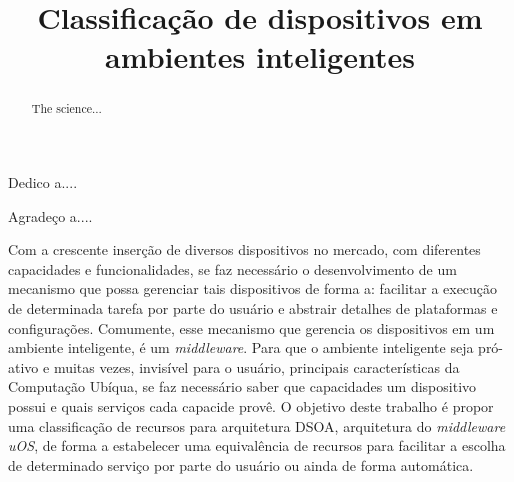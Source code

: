 \documentclass[bacharelado]{unb-cic}
\title{Classificação de dispositivos em ambientes inteligentes}
\begin{document}
  \lstset{tabsize=4}
  \renewcommand\lstlistingname{Listagem}
  \renewcommand\lstlistlistingname{Listagens}
  \maketitle
  \pretextual

  \begin{dedicatoria}
  Dedico a....
  \end{dedicatoria}

  \begin{agradecimentos}
  Agradeço a....
  \end{agradecimentos}

  \begin{resumo}
Com a crescente inserção de diversos dispositivos no mercado, com diferentes capacidades e funcionalidades, se faz necessário o desenvolvimento de um mecanismo que possa gerenciar tais dispositivos de forma a: facilitar a execução de determinada tarefa por parte do usuário e abstrair detalhes de plataformas e configurações. Comumente, esse mecanismo que gerencia os dispositivos em um ambiente inteligente, é um \emph{middleware}. Para que o ambiente inteligente seja pró-ativo e muitas vezes, invisível para o usuário, principais características da Computação Ubíqua, se faz necessário saber que capacidades um dispositivo possui e quais serviços cada capacide provê. O objetivo deste trabalho é propor uma classificação de recursos para arquitetura DSOA, arquitetura do \emph{middleware uOS}, de forma a estabelecer uma equivalência de recursos para facilitar a escolha de determinado serviço por parte do usuário ou ainda de forma automática. 
  \end{resumo}

  \begin{abstract} 
  The science...
  \end{abstract}

  \tableofcontents
  \listoffigures
  \listoftables

  \textual
  
  
  
  
  

  \postextual
  
  
\end{document}
